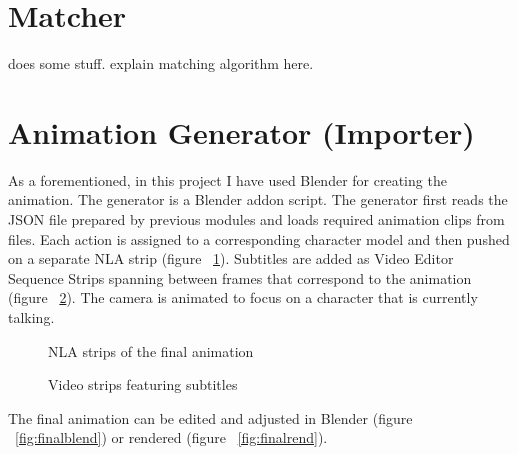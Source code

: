 \section{Matcher}

does some stuff. explain matching algorithm here.


\section{Animation Generator (Importer)}


As a forementioned, in this project I have used Blender for creating the animation. The generator is a Blender addon script. The generator first reads the JSON file prepared by previous modules and loads required animation clips from files. Each action is assigned to a corresponding character model and then pushed on a separate NLA strip (figure ~\ref{fig:nla}). Subtitles are added as Video Editor Sequence Strips spanning between frames that correspond to the animation (figure ~\ref{fig:substrips}). The camera is animated to focus on a character that is currently talking.

\begin{figure}[!ht]
\centerline{}
\caption{NLA strips of the final animation}\label{fig:nla}
\end{figure}
\begin{figure}[!ht]
\centerline{}
\caption{Video strips featuring subtitles}\label{fig:substrips}
\end{figure}

The final animation can be edited and adjusted in Blender (figure ~\ref{fig:finalblend}) or rendered (figure ~\ref{fig:finalrend}).



